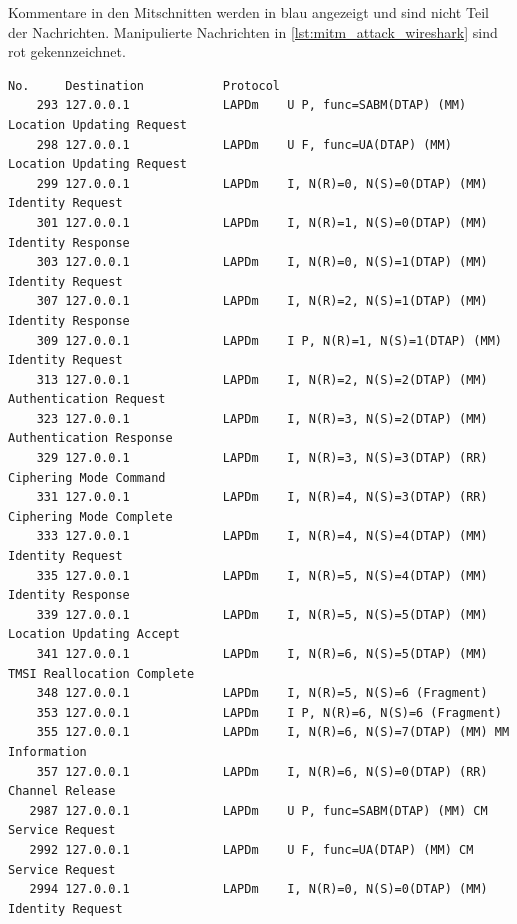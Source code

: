 Kommentare in den Mitschnitten werden in blau angezeigt und sind nicht Teil der Nachrichten. Manipulierte Nachrichten in \autoref{lst:mitm_attack_wireshark} sind rot gekennzeichnet.\\

\begin{lstlisting}[caption={[Aufgezeichneter Nachrichtenverkehr mit E-plus BTS, kurz]Aufgezeichneter Nachrichtenverkehr mit E-plus \ac{BTS}, kurz (ohne \ac{LAPDm}-Kontrollnachrichten), generiert mit Filtern aus Wireshark-Mitschnitt}, label={lst:real_bts_traffic_short_wireshark}, boxpos=c, frame=single, language=bytetxt, numbers=none, basicstyle=\tiny\ttfamily, tabsize=1 ]
No.     Destination           Protocol 
    293 127.0.0.1             LAPDm    U P, func=SABM(DTAP) (MM) Location Updating Request 
    298 127.0.0.1             LAPDm    U F, func=UA(DTAP) (MM) Location Updating Request 
    299 127.0.0.1             LAPDm    I, N(R)=0, N(S)=0(DTAP) (MM) Identity Request 
    301 127.0.0.1             LAPDm    I, N(R)=1, N(S)=0(DTAP) (MM) Identity Response 
    303 127.0.0.1             LAPDm    I, N(R)=0, N(S)=1(DTAP) (MM) Identity Request 
    307 127.0.0.1             LAPDm    I, N(R)=2, N(S)=1(DTAP) (MM) Identity Response 
    309 127.0.0.1             LAPDm    I P, N(R)=1, N(S)=1(DTAP) (MM) Identity Request 
    313 127.0.0.1             LAPDm    I, N(R)=2, N(S)=2(DTAP) (MM) Authentication Request 
    323 127.0.0.1             LAPDm    I, N(R)=3, N(S)=2(DTAP) (MM) Authentication Response 
    329 127.0.0.1             LAPDm    I, N(R)=3, N(S)=3(DTAP) (RR) Ciphering Mode Command 
    331 127.0.0.1             LAPDm    I, N(R)=4, N(S)=3(DTAP) (RR) Ciphering Mode Complete 
    333 127.0.0.1             LAPDm    I, N(R)=4, N(S)=4(DTAP) (MM) Identity Request 
    335 127.0.0.1             LAPDm    I, N(R)=5, N(S)=4(DTAP) (MM) Identity Response 
    339 127.0.0.1             LAPDm    I, N(R)=5, N(S)=5(DTAP) (MM) Location Updating Accept 
    341 127.0.0.1             LAPDm    I, N(R)=6, N(S)=5(DTAP) (MM) TMSI Reallocation Complete 
    348 127.0.0.1             LAPDm    I, N(R)=5, N(S)=6 (Fragment)
    353 127.0.0.1             LAPDm    I P, N(R)=6, N(S)=6 (Fragment)
    355 127.0.0.1             LAPDm    I, N(R)=6, N(S)=7(DTAP) (MM) MM Information 
    357 127.0.0.1             LAPDm    I, N(R)=6, N(S)=0(DTAP) (RR) Channel Release 
   2987 127.0.0.1             LAPDm    U P, func=SABM(DTAP) (MM) CM Service Request 
   2992 127.0.0.1             LAPDm    U F, func=UA(DTAP) (MM) CM Service Request 
   2994 127.0.0.1             LAPDm    I, N(R)=0, N(S)=0(DTAP) (MM) Identity Request 

\end{lstlisting}

